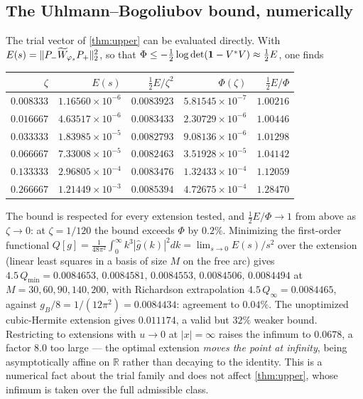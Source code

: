 \subsection{The Uhlmann--Bogoliubov bound, numerically}
The trial vector of \cref{thm:upper} can be evaluated directly.  With
$E(s)=\lVert P_-\widetilde W_{\varphi_s}P_+\rVert_2^2$, so that
$\Phi\le-\frac12\log\det(\mathbf 1-V^*V)\approx\frac12E$, one finds
\begin{center}\small
\begin{tabular}{r r r r r}\toprule
$\zeta$ & $E(s)$ & $\tfrac12E/\zeta^2$ & $\Phi(\zeta)$ & $\tfrac12E/\Phi$\\\midrule
$0.008333$ & $1.16560\times10^{-6}$ & $0.0083923$ & $5.81545\times10^{-7}$ & $1.00216$\\
$0.016667$ & $4.63517\times10^{-6}$ & $0.0083433$ & $2.30729\times10^{-6}$ & $1.00446$\\
$0.033333$ & $1.83985\times10^{-5}$ & $0.0082793$ & $9.08136\times10^{-6}$ & $1.01298$\\
$0.066667$ & $7.33008\times10^{-5}$ & $0.0082463$ & $3.51928\times10^{-5}$ & $1.04142$\\
$0.133333$ & $2.96805\times10^{-4}$ & $0.0083476$ & $1.32433\times10^{-4}$ & $1.12059$\\
$0.266667$ & $1.21449\times10^{-3}$ & $0.0085394$ & $4.72675\times10^{-4}$ & $1.28470$\\
\bottomrule\end{tabular}
\end{center}
The bound is respected for every extension tested, and
$\frac12E/\Phi\to1$ from above as $\zeta\to0$: at $\zeta=1/120$ the bound exceeds
$\Phi$ by $0.2\%$.  Minimizing the first-order functional
$Q[g]=\frac1{48\pi^2}\int_0^\infty k^3|\widehat g(k)|^2dk=\lim_{s\to0}E(s)/s^2$
over the extension (linear least squares in a basis of size $M$ on the free arc)
gives $4.5\,Q_{\min}=0.0084653,\,0.0084581,\,0.0084553,\,0.0084506,\,0.0084494$ at
$M=30,60,90,140,200$, with Richardson extrapolation
$4.5\,Q_\infty=0.0084465$, against $g_B/8=1/(12\pi^2)=0.0084434$: agreement to
$0.04\%$.  The unoptimized cubic-Hermite extension gives $0.011174$, a valid but
$32\%$ weaker bound.  Restricting to extensions with $u\to0$ at $|x|=\infty$
raises the infimum to $0.0678$, a factor $8.0$ too large --- the optimal extension
\emph{moves the point at infinity}, being asymptotically affine on $\mathbb R$
rather than decaying to the identity.  This is a numerical fact about the trial
family and does not affect \cref{thm:upper}, whose infimum is taken over the full
admissible class.

